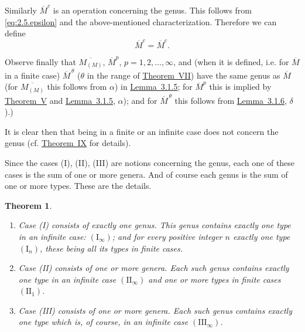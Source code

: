 \documentclass[b5paper,twoside]{article}
\newcommand{\thmref}[2]{\hyperref[#1]{\mbox{Theorem~#2}}}
\newcommand{\lemref}[2]{\hyperref[#1]{\mbox{Lemma~#2}}}
\theoremstyle{mvnplain}
\newtheorem{theorem}{Theorem}
\newcommand{\M}{\mathbf M}
\def\M{M}%
\def\widetilde#1{#1}%
\def\mathfrak#1{#1}%
\begin{document}
Similarly \(\overline{\M}^{c}\) is an operation concerning the genus. This
follows from \eqref{eq:2.5.epsilon} and the above-mentioned characterization.
Therefore we can define
\[
 \widetilde{\overline{\M}}^{c}
 =\widetilde{\overline{\M}^{c}}.
\]

Observe finally that \(\overline{\M_{(\mathfrak M)}}\),
\(\overline{\M}^{p}\), \(p=1,2,\ldots,\infty\), and (when it is defined,
i.e. for \(\overline{\M}\) in a finite case)
\(\overline{\M}^{\,\theta}\) (\(\theta\) in the range of
\thmref{thm:VII}{VII}) have the same genus as \(\overline{\M}\) (for
\(\overline{\M_{(\mathfrak M)}}\) this follows from \(\alpha\)) in
\lemref{lem:3.1.5}{3.1.5}; for \(\overline{\M}^{p}\) this is implied by
\thmref{thm:V}{V} and \lemref{lem:3.1.5}{3.1.5}, \(\alpha\)); and for
\(\overline{\M}^{\,\theta}\) this follows from
\lemref{lem:3.1.6}{3.1.6}, \(\delta\)).)

It is clear then that being in a finite or an infinite case does not concern
the genus (cf. \thmref{thm:IX}{IX} for details).

Since the cases (I), (II), (III) are notions concerning the genus, each one of
these cases is the sum of one or more genera. And of course each genus is the
sum of one or more types. These are the details.

\begin{theorem}\label{thm:IX}
\begin{enumerate}[label={}]
\item[\(\alpha\))] Case (I) consists of exactly one genus. This genus contains exactly one
type in an infinite case: \((\mathrm I_\infty)\); and for every positive integer
\(n\) exactly one type \((\mathrm I_n)\), these being all its types in finite
cases.
\item[\(\beta\))] Case (II) consists of one or more genera. Each such genus contains
exactly one type in an infinite case \((\mathrm {II}_\infty)\) and one or more
types in finite cases \((\mathrm {II}_1)\).
\item[\(\gamma\))] Case (III) consists of one or more genera. Each such genus contains
exactly one type which is, of course, in an infinite case
\((\mathrm {III}_\infty)\).
\end{enumerate}
\end{theorem}
\end{document}
